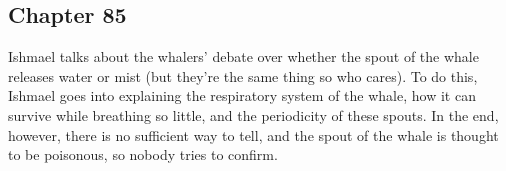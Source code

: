 \subsection{Chapter 85}

Ishmael talks about the whalers' debate over whether the spout of the whale
releases water or mist (but they're the same thing so who cares). To do this,
Ishmael goes into explaining the respiratory system of the whale, how it can
survive while breathing so little, and the periodicity of these spouts. In the
end, however, there is no sufficient way to tell, and the spout of the whale is
thought to be poisonous, so nobody tries to confirm.
